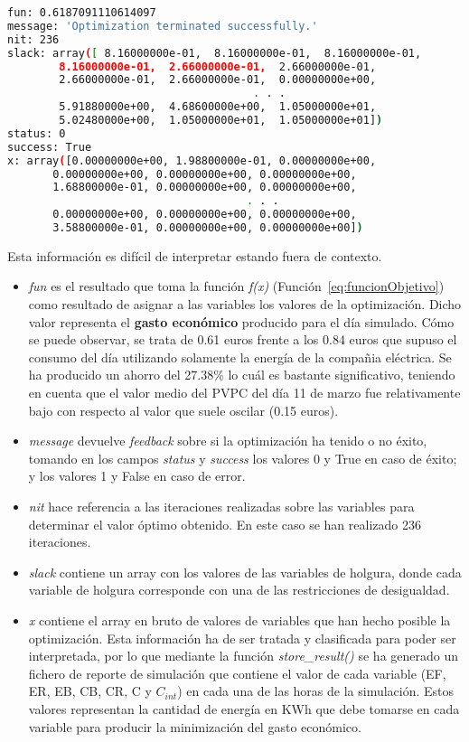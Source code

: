 \begin{lstlisting}[language=bash,float=ht,numbers=none,caption={Salida del algoritmo \textit{linprog}},label={lst:output}]
fun: 0.6187091110614097
message: 'Optimization terminated successfully.'
nit: 236
slack: array([ 8.16000000e-01,  8.16000000e-01,  8.16000000e-01,
        8.16000000e-01,  2.66000000e-01,  2.66000000e-01,
        2.66000000e-01,  2.66000000e-01,  0.00000000e+00,
                                      . . .
        5.91880000e+00,  4.68600000e+00,  1.05000000e+01,
        5.02480000e+00,  1.05000000e+01,  1.05000000e+01])
status: 0
success: True
x: array([0.00000000e+00, 1.98800000e-01, 0.00000000e+00,
       0.00000000e+00, 0.00000000e+00, 0.00000000e+00,
       1.68800000e-01, 0.00000000e+00, 0.00000000e+00,
                                     . . .
       0.00000000e+00, 0.00000000e+00, 0.00000000e+00,
       3.58800000e-01, 0.00000000e+00, 0.00000000e+00])
\end{lstlisting}
Esta información es difícil de interpretar estando fuera de contexto.
\begin{itemize}
\item \textit{fun} es el resultado que toma la función \textit{f(x)} (Función~\ref{eq:funcionObjetivo}) como resultado de asignar a las variables los valores de la optimización. Dicho valor representa el \textbf{gasto económico} producido para el día simulado. Cómo se puede observar, se trata de 0.61 euros frente a los 0.84 euros que supuso el consumo del día utilizando solamente la energía de la compañia eléctrica. Se ha producido un ahorro del 27.38\% lo cuál es bastante significativo, teniendo en cuenta que el valor medio del PVPC del día 11 de marzo fue relativamente bajo con respecto al valor que suele oscilar (0.15 euros).
\item \textit{message} devuelve \textit{feedback} sobre si la optimización ha tenido o no éxito, tomando en los campos \textit{status} y \textit{success} los valores 0 y True en caso de éxito; y los valores 1 y False en caso de error.
\item \textit{nit} hace referencia a las iteraciones realizadas sobre las variables para determinar el valor óptimo obtenido. En este caso se han realizado 236 iteraciones.
\item \textit{slack} contiene un array con los valores de las variables de holgura, donde cada variable de holgura corresponde con una de las restricciones de desigualdad.
\item \textit{x} contiene el array en bruto de valores de variables que han hecho posible la optimización. Esta información ha de ser tratada y clasificada para poder ser interpretada, por lo que mediante la función \textit{store\_result()} se ha generado un fichero de reporte de simulación que contiene el valor de cada variable (EF, ER, EB, CB, CR, C y $ C_{int} $) en cada una de las horas de la simulación. Estos valores representan la cantidad de energía en KWh que debe tomarse en cada variable para producir la minimización del gasto económico.
\end{itemize}
